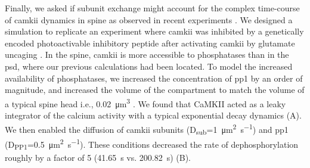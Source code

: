 \documentclass[9pt,lineno,doublespacing]{elife}
\newcommand\SUB[2]{#1\textsubscript{#2}}
\begin{document}
Finally, we asked if subunit exchange might account for the complex time-course
of \gls{camkii} dynamics in spine as observed in recent experiments
\citep{chang_camkii_2017}. We designed a simulation to replicate an experiment
where \gls{camkii} was inhibited by a genetically encoded photoactivable
inhibitory peptide after activating \gls{camkii} by glutamate uncaging
\citep{murakoshi_kinetics_2017}. In the spine, \gls{camkii} is more accessible
to phosphatases than in the \gls{psd}, where our previous calculations had been
located. To model the increased availability of phosphatases, we increased the
concentration of \gls{pp1} by an order of magnitude, and increased the volume of
the compartment to match the volume of a typical spine head i.e.,
\SI{0.02}{\cubic\micro\meter} \citep{bartol_nanoconnectomic_2015}. We found that
CaMKII acted as a leaky integrator of the calcium activity with a typical
exponential decay dynamics (A). We then enabled the
diffusion of \gls{camkii} subunits
(\SUB{D}{sub}=\SI{1}{\micro\meter\squared\per\second}) and \gls{pp1}
(\SUB{D}{PP1}=\SI{0.5}{\micro\meter\squared\per\second}). These conditions
decreased the rate of dephosphorylation roughly by a factor of 5
(\SI{41.65}{\second} vs. \SI{200.82}{\second}) (B). 
\end{document}
